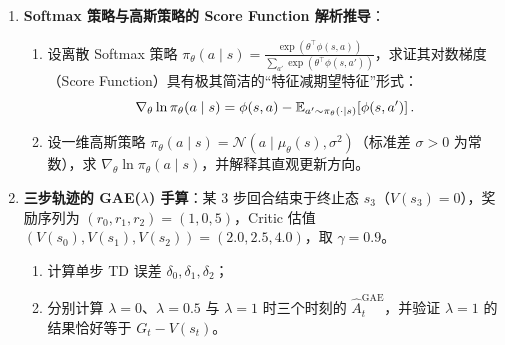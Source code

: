 \begin{enumerate}
  \item[\textbf{6.2.1}] \textbf{Softmax 策略与高斯策略的 Score Function 解析推导}：
  \begin{enumerate}
    \item 设离散 Softmax 策略 $\pi_\theta(a \mid s) = \frac{\exp(\theta^\top \phi(s, a))}{\sum_{a'} \exp(\theta^\top \phi(s, a'))}$，求证其对数梯度（Score Function）具有极其简洁的“特征减期望特征”形式：
    \[
      \nabla_\theta \ln \pi_\theta(a \mid s) = \phi(s, a) - \mathbb{E}_{a' \sim \pi_\theta(\cdot \mid s)}\!\left[\phi(s, a')\right].
    \]
    \item 设一维高斯策略 $\pi_\theta(a \mid s) = \mathcal{N}\!\left(a \mid \mu_\theta(s), \sigma^2\right)$（标准差 $\sigma > 0$ 为常数），求 $\nabla_\theta \ln \pi_\theta(a \mid s)$，并解释其直观更新方向。
  \end{enumerate}

  \item[\textbf{6.2.2}] \textbf{三步轨迹的 GAE($\lambda$) 手算}：某 3 步回合结束于终止态 $s_3$（$V(s_3) = 0$），奖励序列为 $(r_0, r_1, r_2) = (1, 0, 5)$，Critic 估值 $(V(s_0), V(s_1), V(s_2)) = (2.0, 2.5, 4.0)$，取 $\gamma = 0.9$。
  \begin{enumerate}
    \item 计算单步 TD 误差 $\delta_0, \delta_1, \delta_2$；
    \item 分别计算 $\lambda = 0$、$\lambda = 0.5$ 与 $\lambda = 1$ 时三个时刻的 $\hat{A}_t^{\mathrm{GAE}}$，并验证 $\lambda = 1$ 的结果恰好等于 $G_t - V(s_t)$。
  \end{enumerate}
\end{enumerate}



